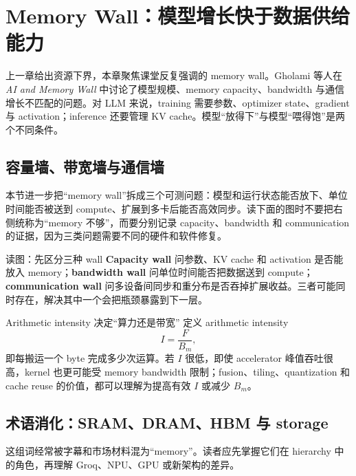 \section{Memory Wall：模型增长快于数据供给能力}

上一章给出资源下界，本章聚焦课堂反复强调的 memory wall。Gholami 等人在 \emph{AI and Memory Wall} 中讨论了模型规模、memory capacity、bandwidth 与通信增长不匹配的问题。对 LLM 来说，training 需要参数、optimizer state、gradient 与 activation；inference 还要管理 KV cache。模型“放得下”与模型“喂得饱”是两个不同条件。

\subsection{容量墙、带宽墙与通信墙}

本节进一步把“memory wall”拆成三个可测问题：模型和运行状态能否放下、单位时间能否被送到 compute、扩展到多卡后能否高效同步。读下面的图时不要把右侧统称为“memory 不够”，而要分别记录 capacity、bandwidth 和 communication 的证据，因为三类问题需要不同的硬件和软件修复。


\begin{knowledgebox}{读图：先区分三种 wall}
\textbf{Capacity wall} 问参数、KV cache 和 activation 是否能放入 memory；\textbf{bandwidth wall} 问单位时间能否把数据送到 compute；\textbf{communication wall} 问多设备间同步和重分布是否吞掉扩展收益。三者可能同时存在，解决其中一个会把瓶颈暴露到下一层。
\end{knowledgebox}

\begin{importantbox}{Arithmetic intensity 决定“算力还是带宽”}
定义 arithmetic intensity
\[
I=\frac{F}{B_m},
\]
即每搬运一个 byte 完成多少次运算。若 $I$ 很低，即使 accelerator 峰值吞吐很高，kernel 也更可能受 memory bandwidth 限制；fusion、tiling、quantization 和 cache reuse 的价值，都可以理解为提高有效 $I$ 或减少 $B_m$。
\end{importantbox}

\subsection{术语消化：SRAM、DRAM、HBM 与 storage}

这组词经常被字幕和市场材料混为“memory”。读者应先掌握它们在 hierarchy 中的角色，再理解 Groq、NPU、GPU 或新架构的差异。

